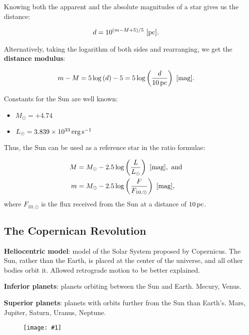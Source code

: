 \documentclass[a4paper,10pt]{article}
\newcommand{\fig}[1]{\centerline{\texttt{[image: \#1]}}}
\begin{document}
Knowing both the apparent and the absolute magnitudes of a star gives us the distance:

\begin{align*}
    d = 10^{(m-M+5)/5}~[{\rm pc}].
\end{align*}

Alternatively, taking the logarithm of both sides and rearranging, we get the \textbf{distance modulus}: 

\begin{align*}
    m-M = 5\log\left(d\right)-5 = 5\log\left({\frac{d}{10\,{\rm pc}}}\right)~[{\rm mag}].
\end{align*}

Constants for the Sun are well known:

\begin{itemize}
    \item $M_\odot = +4.74$
    \item $L_\odot= 3.839\times 10^{33}\,{\rm erg\,s^{-1}}$
\end{itemize}

Thus, the Sun can be used as a reference star in the ratio formulae: 

\begin{align*}
    M &= M_\odot - 2.5\log\left(\frac{L}{L_\odot}\right)~[{\rm mag}],~{\rm and }\\
    m &= M_\odot - 2.5\log\left(\frac{F}{F_{10, \odot}}\right)~[{\rm mag}],
\end{align*}
where $F_{10, \odot}$ is the flux received from the Sun at a distance of $10\,{\rm pc}$.

\subsection{The Copernican Revolution}

\textbf{Heliocentric model}: model of the Solar System proposed by Copernicus. The Sun, rather than the Earth, is placed at the center of the universe, and all other bodies orbit it. Allowed retrograde motion to be better explained. 

\textbf{Inferior planets}: planets orbiting between the Sun and Earth. Mecury, Venus.  

\textbf{Superior planets}: planets with orbits further from the Sun than Earth's. Mars, Jupiter, Saturn, Uranus, Neptune. 

\begin{figure}[h]
    \fig{orbital_configs}
\end{figure}
\end{document}
